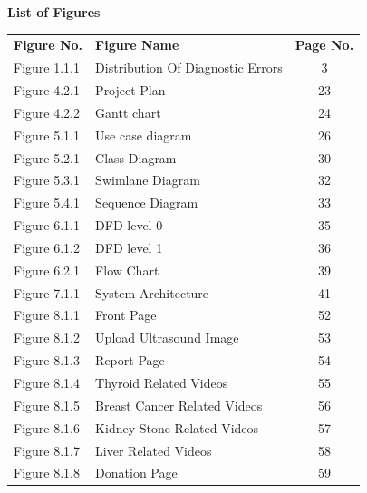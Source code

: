 \documentclass[12pt]{article}
\begin{document}
\begin{center}
    {\Large \bf List of Figures}
\end{center}

\vspace{1em}

\noindent
\begin{tabular}{l p{10cm} c}
\textbf{Figure No.} & \textbf{Figure Name} & \textbf{Page No.} \\[6pt]
Figure 1.1.1 & Distribution Of Diagnostic Errors & 3\\
Figure 4.2.1 & Project Plan & 23\\
Figure 4.2.2 & Gantt chart & 24\\
Figure 5.1.1 & Use case diagram & 26\\
Figure 5.2.1 & Class Diagram & 30\\
Figure 5.3.1 & Swimlane Diagram & 32\\
Figure 5.4.1 & Sequence Diagram & 33\\
Figure 6.1.1 & DFD level 0 & 35\\
Figure 6.1.2 & DFD level 1 & 36\\
Figure 6.2.1 & Flow Chart & 39\\
Figure 7.1.1 & System Architecture & 41\\
Figure 8.1.1 & Front Page & 52\\
Figure 8.1.2 & Upload Ultrasound Image & 53\\
Figure 8.1.3 & Report Page & 54\\
Figure 8.1.4 & Thyroid Related Videos & 55\\
Figure 8.1.5 & Breast Cancer Related Videos & 56\\
Figure 8.1.6 & Kidney Stone Related Videos & 57\\
Figure 8.1.7 & Liver Related Videos & 58\\
Figure 8.1.8 & Donation Page & 59\\
\end{tabular}
\end{document}
